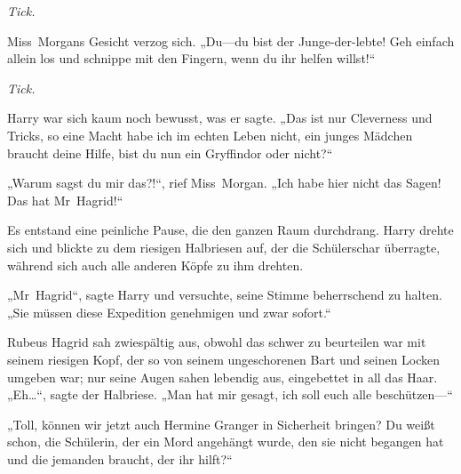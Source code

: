 \emph{Tick.}

Miss~Morgans Gesicht verzog sich.
„Du—du bist der Junge-der-lebte! Geh einfach allein los und schnippe mit den Fingern, wenn du ihr helfen willst!“

\emph{Tick.}

Harry war sich kaum noch bewusst, was er sagte.
„Das ist nur Cleverness und Tricks, so eine Macht habe ich im echten Leben nicht, ein junges Mädchen braucht deine Hilfe, bist du nun ein Gryffindor oder nicht?“

„Warum sagst du mir das?!“, rief Miss~Morgan. „Ich habe hier nicht das Sagen! Das hat Mr~Hagrid!“


Es entstand eine peinliche Pause, die den ganzen Raum durchdrang. Harry drehte sich und blickte zu dem riesigen Halbriesen auf, der die Schülerschar überragte, während sich auch alle anderen Köpfe zu ihm drehten.

„Mr~Hagrid“, sagte Harry und versuchte, seine Stimme beherrschend zu halten. „Sie müssen diese Expedition genehmigen und zwar sofort.“

Rubeus Hagrid sah zwiespältig aus, obwohl das schwer zu beurteilen war mit seinem riesigen Kopf, der so von seinem ungeschorenen Bart und seinen Locken umgeben war; nur seine Augen sahen lebendig aus, eingebettet in all das Haar.
„Eh…“, sagte der Halbriese. „Man hat mir gesagt, ich soll euch alle beschützen—“

„Toll, können wir jetzt auch Hermine Granger in Sicherheit bringen? Du weißt schon, die Schülerin, der ein Mord angehängt wurde, den sie nicht begangen hat und die jemanden braucht, der ihr hilft?“

